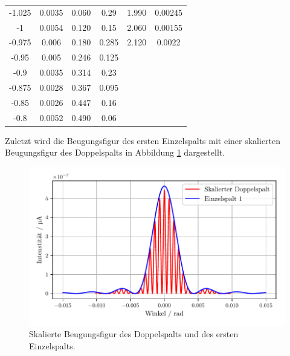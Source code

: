 \begin{table}
\begin{tabular}{c c c c c c}
-1.025 & 0.0035   & 0.060  & 0.29     & 1.990   & 0.00245 \\
-1     & 0.0054   & 0.120  & 0.15     & 2.060   & 0.00155 \\
-0.975 & 0.006    & 0.180  & 0.285    & 2.120   & 0.0022\\
-0.95  & 0.005    & 0.246  & 0.125    & &\\
-0.9   & 0.0035   & 0.314  & 0.23     & &\\
-0.875 & 0.0028   & 0.367  & 0.095    & &\\
-0.85  & 0.0026   & 0.447  & 0.16     & &\\
-0.8   & 0.0052   & 0.490  & 0.06     & &\\
\bottomrule
\end{tabular}
\end{table}

Zuletzt wird die Beugungsfigur des ersten Einzelspalts mit einer skalierten Beugungsfigur des Doppelspalts
in Abbildung \ref{fig:vergleich} dargestellt.

\begin{figure}[H]
  \center
  \includegraphics[scale = 0.75]{Vergleich.pdf}
  \caption{Skalierte Beugungsfigur des Doppelspalts und des ersten Einzelspalts.}
  \label{fig:vergleich}
\end{figure}